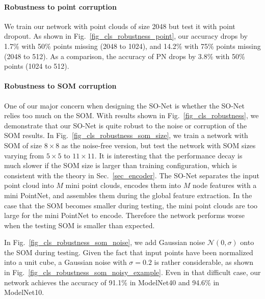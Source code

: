 \documentclass[10pt,twocolumn,letterpaper]{article}
\begin{document}
\paragraph{Robustness to point corruption}
We train our network with point clouds of size 2048 but test it with point dropout. As shown in Fig.~\ref{fig_cls_robustness_point}, our accuracy drops by 1.7\% with 50\% points missing (2048 to 1024), and 14.2\% with 75\% points missing (2048 to 512). As a comparison, the accuracy of PN drops by 3.8\% with 50\% points (1024 to 512).

\paragraph{Robustness to SOM corruption}
One of our major concern when designing the SO-Net is whether the SO-Net relies too much on the SOM. With results shown in Fig.~\ref{fig_cls_robustness}, we demonstrate that our SO-Net is quite robust to the noise or corruption of the SOM results. In Fig.~\ref{fig_cls_robustness_som_size}, we train a network with SOM of size $8\times8$ as the noise-free version, but test the network with SOM sizes varying from $5\times5$ to $11\times11$. It is interesting that the performance decay is much slower if the SOM size is larger than training configuration, which is consistent with the theory in Sec.~\ref{sec_encoder}. The SO-Net separates the input point cloud into $M$ mini point clouds, encodes them into $M$ node features with a mini PointNet, and assembles them during the global feature extraction. In the case that the SOM becomes smaller during testing, the mini point clouds are too large for the mini PointNet to encode. Therefore the network performs worse when the testing SOM is smaller than expected.

In Fig.~\ref{fig_cls_robustness_som_noise}, we add Gaussian noise $\mathcal{N}(0, \sigma)$ onto the SOM during testing. Given the fact that input points have been normalized into a unit cube, a Gaussian noise with $\sigma=0.2$ is rather considerable, as shown in Fig.~\ref{fig_cls_robustness_som_noisy_example}. Even in that difficult case, our network achieves the accuracy of 91.1\% in ModelNet40 and 94.6\% in ModelNet10. 
\end{document}
